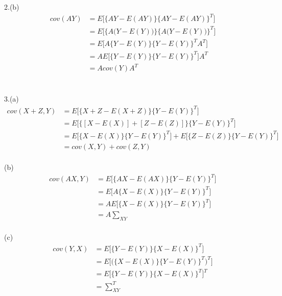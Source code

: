 \documentclass[fleqn]{article}
\begin{document}
2.(b)\\

\begin{equation*}
\begin{split}
cov(AY) &= E\big[\{AY - E(AY)\}  \{AY - E(AY)\}^T\big]\\
&= E\big[\{A\big(Y - E(Y)\big)\}  \{A\big(Y - E(Y)\big)\}^T\big]\\
&= E\big[A\{Y - E(Y)\}  \{Y - E(Y)\}^T A^T\big]\\
&= A E\big[\{Y - E(Y)\}  \{Y - E(Y)\}^T\big] A^T\\
&= A cov(Y) A^T
\end{split}
\end{equation*}\\
\\



3.(a)\\

\begin{equation*}
\begin{split}
cov(X + Z, Y) &= E\big[\{X + Z - E(X + Z)\}  \{Y - E(Y)\}^T\big]\\
&= E\big[\{[X - E(X)] + [Z - E(Z)]\}  \{Y - E(Y)\}^T\big]\\
&= E\big[\{X - E(X)\}  \{Y - E(Y)\}^T\big] + E\big[\{Z - E(Z)\}  \{Y - E(Y)\}^T\big]\\
&= cov(X, Y) + cov(Z, Y)
\end{split}
\end{equation*}\\



(b)\\

\begin{equation*}
\begin{split}
cov(AX, Y) &= E\big[\{AX - E(AX)\}  \{Y - E(Y)\}^T\big]\\
&= E\big[A \{X - E(X)\}  \{Y - E(Y)\}^T\big]\\
&= A E\big[\{X - E(X)\}  \{Y - E(Y)\}^T\big]\\
&= A \sum\nolimits_{XY}
\end{split}
\end{equation*}\\



(c)\\

\begin{equation*}
\begin{split}
cov(Y, X) &= E\big[\{Y - E(Y)\}  \{X - E(X)\}^T\big]\\
&= E\big[\big(\{X - E(X)\}  \{Y - E(Y)\}^T\big)^T\big]\\
&= E\big[\{Y - E(Y)\}  \{X - E(X)\}^T\big]^T\\
&= \sum\nolimits_{XY}^T
\end{split}
\end{equation*}\\
\end{document}

